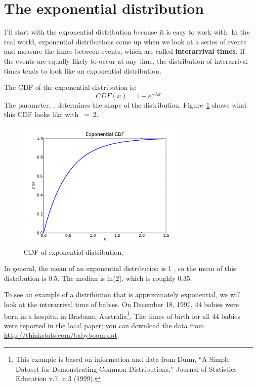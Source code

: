 \documentclass[12pt]{book}
\begin{document}
\section{The exponential distribution}

I'll start with the exponential distribution because it is
easy to work with.  In the real world, exponential distributions
come up when we look at a series of events and measure the
times between events, which are called {\bf interarrival times}.
If the events are equally likely to occur at any time, the distribution
of interarrival times tends to look like an exponential distribution.

The CDF of the exponential distribution is:
%
\[ CDF(x) = 1 - e^{-\lambda x} \]
%
The parameter, \mylambda, determines the shape of the
distribution.  Figure~\ref{expo_cdf} shows what this CDF looks like with
\mylambda~=~2.


\begin{figure}
\centerline{\includegraphics[height=2.5in]{figs/expo_cdf.pdf}}
\caption{CDF of exponential distribution.}
\label{expo_cdf}
\end{figure}

In general, the mean of an exponential distribution is 1\mydivide
\mylambda, so the mean of this distribution is 0.5.  The median is
ln(2)\mydivide\mylambda, which is roughly 0.35.  
  

To see an example of a distribution that is approximately exponential,
we will look at the interarrival time of babies.
On December 18, 1997, 44 babies were born in a hospital in Brisbane,
Australia\footnote{This example is based on information and data from
  Dunn, ``A Simple Dataset for Demonstrating Common Distributions,''
  Journal of Statistics Education v.7, n.3 (1999).}.  The times of
birth for all 44 babies were reported in the local paper; you can
download the data from \url{http://thinkstats.com/babyboom.dat}.
\end{document}
